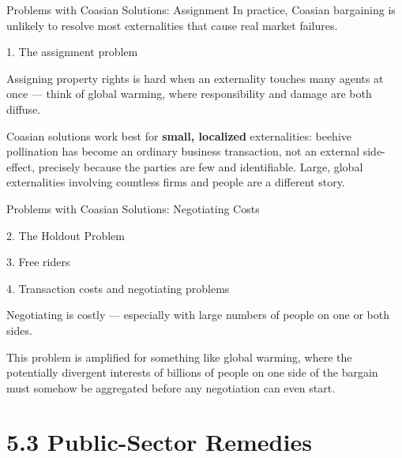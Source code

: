 \documentclass[11pt,aspectratio=169]{beamer}
\begin{document}
\begin{frame}{Problems with Coasian Solutions: Assignment}
  In practice, Coasian bargaining is unlikely to resolve most externalities that cause real market failures.
  \begin{block}{1. The assignment problem}
    \end{block}
    Assigning property rights is hard when an externality touches many agents at once --- think of global warming, where responsibility and damage are both diffuse.

  \small Coasian solutions work best for \textbf{small, localized} externalities: beehive pollination has become an ordinary business transaction, not an external side-effect, precisely because the parties are few and identifiable. Large, global externalities involving countless firms and people are a different story.
\end{frame}

\begin{frame}{Problems with Coasian Solutions: Negotiating Costs}
	  \begin{block}{2. The Holdout Problem}
	\end{block}
	\begin{block}{3. Free riders}

	\end{block}
  \begin{block}{4. Transaction costs and negotiating problems}
    \end{block}
    Negotiating is costly --- especially with large numbers of people on one or both sides.

  \small This problem is amplified for something like global warming, where the potentially divergent interests of billions of people on one side of the bargain must somehow be aggregated before any negotiation can even start.
  \vspace{0.6em}



\end{frame}

\section{5.3 Public-Sector Remedies}
\end{document}
